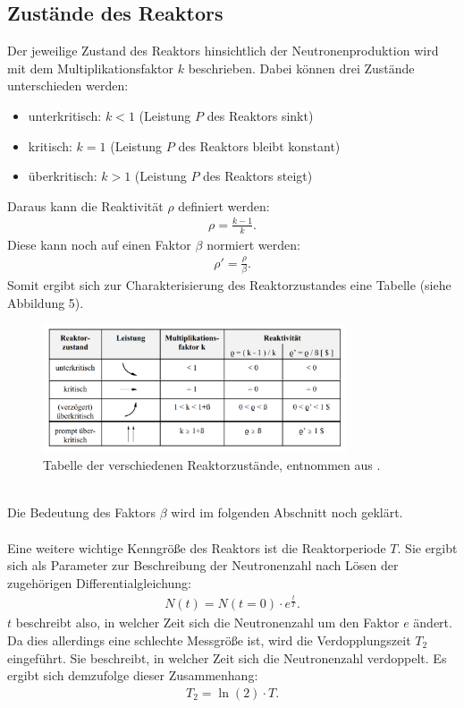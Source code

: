 \documentclass[german,  %
parskip=full,  %
]{scrartcl}
\begin{document}
\subsection{Zustände des Reaktors}
Der jeweilige Zustand des Reaktors hinsichtlich der Neutronenproduktion wird mit dem Multiplikationsfaktor $k$ beschrieben. Dabei können drei Zustände unterschieden werden:
\begin{itemize}
\item unterkritisch: $k<1$ (Leistung $P$ des Reaktors sinkt)
\item kritisch: $k=1$ (Leistung $P$ des Reaktors bleibt konstant)
\item überkritisch: $k>1$ (Leistung $P$ des Reaktors steigt)
\end{itemize}
Daraus kann die Reaktivität $\rho$ definiert werden:
\begin{align}
\rho = \frac{k-1}{k}.
\end{align}
Diese kann noch auf einen Faktor $\beta$ normiert werden:
\begin{align}
\rho' = \frac{\rho}{\beta}.
\end{align}
Somit ergibt sich zur Charakterisierung des Reaktorzustandes eine Tabelle (siehe Abbildung 5).
\\
\begin{figure}[h!]\centering
\includegraphics[width=0.8\textwidth]{zustand}
\caption{Tabelle der verschiedenen Reaktorzustände, entnommen aus \cite{1}.}
\end{figure}
\\
Die Bedeutung des Faktors $\beta$ wird im folgenden Abschnitt noch geklärt.
\\\\
Eine weitere wichtige Kenngröße des Reaktors ist die Reaktorperiode $T$. Sie ergibt sich als Parameter zur Beschreibung der Neutronenzahl nach Lösen der zugehörigen Differentialgleichung:
\begin{align}
N(t) = N(t=0) \cdot e^{\frac{t}{T}}.
\end{align}
$t$ beschreibt also, in welcher Zeit sich die Neutronenzahl um den Faktor $e$ ändert. Da dies allerdings eine schlechte Messgröße ist, wird die Verdopplungszeit $T_2$ eingeführt. Sie beschreibt, in welcher Zeit sich die Neutronenzahl verdoppelt. Es ergibt sich demzufolge dieser Zusammenhang:
\begin{align}
T_2 = \ln(2) \cdot T.
\end{align}
\end{document}
